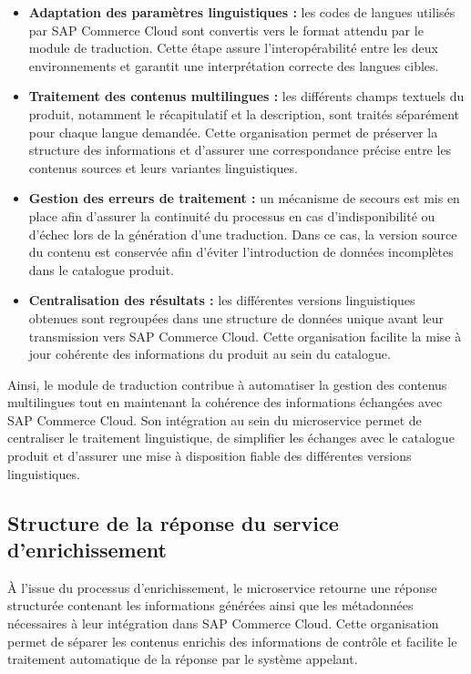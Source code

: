 \begin{itemize}
    \item \textbf{Adaptation des paramètres linguistiques :} les codes de langues utilisés par SAP Commerce Cloud sont convertis vers le format attendu par le module de traduction. Cette étape assure l'interopérabilité entre les deux environnements et garantit une interprétation correcte des langues cibles.

    \item \textbf{Traitement des contenus multilingues :} les différents champs textuels du produit, notamment le récapitulatif et la description, sont traités séparément pour chaque langue demandée. Cette organisation permet de préserver la structure des informations et d'assurer une correspondance précise entre les contenus sources et leurs variantes linguistiques.
\newpage
    \item \textbf{Gestion des erreurs de traitement :} un mécanisme de secours est mis en place afin d'assurer la continuité du processus en cas d'indisponibilité ou d'échec lors de la génération d'une traduction. Dans ce cas, la version source du contenu est conservée afin d'éviter l'introduction de données incomplètes dans le catalogue produit.

    \item \textbf{Centralisation des résultats :} les différentes versions linguistiques obtenues sont regroupées dans une structure de données unique avant leur transmission vers SAP Commerce Cloud. Cette organisation facilite la mise à jour cohérente des informations du produit au sein du catalogue.
\end{itemize}

Ainsi, le module de traduction contribue à automatiser la gestion des contenus multilingues tout en maintenant la cohérence des informations échangées avec SAP Commerce Cloud. Son intégration au sein du microservice permet de centraliser le traitement linguistique, de simplifier les échanges avec le catalogue produit et d'assurer une mise à disposition fiable des différentes versions linguistiques.

\subsection{Structure de la réponse du service d'enrichissement}

À l'issue du processus d'enrichissement, le microservice retourne une réponse structurée contenant les informations générées ainsi que les métadonnées nécessaires à leur intégration dans SAP Commerce Cloud. Cette organisation permet de séparer les contenus enrichis des informations de contrôle et facilite le traitement automatique de la réponse par le système appelant.

